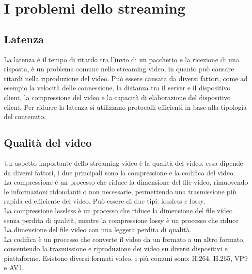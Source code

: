 \section{I problemi dello streaming}
\subsection{Latenza}
La latenza è il tempo di ritardo tra l'invio di un pacchetto e la ricezione di una risposta, è un problema comune nello streaming video, in quanto può causare ritardi nella riproduzione del video.
Può essere causata da diversi fattori, come ad esempio la velocità delle connessione, la distanza tra il server e il dispositivo client, la compressione del video e la capacità di elaborazione del dispositivo client.
Per ridurre la latenza si utilizzano protocolli efficienti in base alla tipologia del contenuto.\\

\subsection{Qualità del video}
Un aspetto importante dello streaming video è la qualità del video, essa dipende da diversi fattori, i due principali sono la compressione e la codifica del video.\\
La compressione è un processo che riduce la dimensione del file video, rimuovendo le informazioni ridondanti o non necessarie, permettendo una trasmissione più rapida ed efficiente del video.
Può essere di due tipi: lossless e lossy.\\
La compressione lossless è un processo che riduce la dimensione del file video senza perdita di qualità, mentre la compressione lossy è un processo che riduce
La dimensione del file video con una leggera perdita di qualità.\\ 
La codifica è un processo che converte il video da un formato a un altro formato, consentendo la trasmissione e riproduzione dei video su diversi dispositivi e piattaforme.
Esistono diversi formati video, i più comuni sono: H.264, H.265, VP9 e AV1.\\


